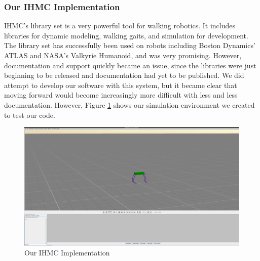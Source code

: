     \subsubsection{Our IHMC Implementation}
        IHMC's library set is a very powerful tool for walking robotics. It includes libraries for dynamic modeling, walking gaits, and simulation for development. The library set has successfully been used on robots including Boston Dynamics' ATLAS and NASA's Valkyrie Humanoid, and was very promising. However, documentation and support quickly became an issue, since the libraries were just beginning to be released and documentation had yet to be published. We did attempt to develop our software with this system, but it became clear that moving forward would become increasingly more difficult with less and less documentation. However, Figure \ref{fig:IHMCImplementation} shows our simulation environment we created to test our code.
        \begin{figure}
            \centering
            \includegraphics{figures/IHMCImplementation.png}
            \caption{Our IHMC Implementation}
            \label{fig:IHMCImplementation}
        \end{figure}